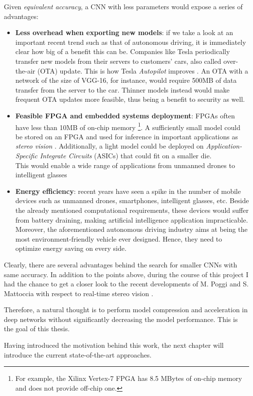 Given \emph{equivalent accuracy}, a CNN with less parameters would expose a series of advantages: 

\begin{itemize}
    \item \textbf{Less overhead when exporting new models}: if we take a look at an important recent trend such as that of autonomous driving, it is immediately clear how big of a benefit this can be. Companies like Tesla periodically transfer new models from their servers to customers' cars, also called over-the-air (OTA) update. This is how Tesla \emph{Autopilot} improves \parencite{tesla}. An OTA with a network of the size of VGG-16, for instance, would require 500MB of data transfer from the server to the car. Thinner models instead would make frequent OTA updates more feasible, thus being a benefit to security as well. 
    
    \item \textbf{Feasible FPGA and embedded systems deployment}: FPGAs often have less than 10MB of on-chip memory \footnote{For example, the Xilinx Vertex-7 FPGA has 8.5 MBytes of on-chip memory and does not provide off-chip one.}. A sufficiently small model could be stored on an FPGA and used for inference in important applications as \emph{stereo vision} \parencite{mattoccia}. Additionally, a light model could be deployed on \emph{Application-Specific Integrate Circuits} (ASICs) that could fit on a smaller die.  \\
    This would enable a wide range of applications from unmanned drones to intelligent glasses
    
    \item \textbf{Energy efficiency}: recent years have seen a spike in the number of mobile devices such as unmanned drones, smartphones, intelligent glasses, etc. Beside the already mentioned computational requirements, these devices would suffer from battery draining, making artificial intelligence application impracticable. \\
    Moreover, the aforementioned autonomous driving industry aims at being the most environment-friendly vehicle ever designed. Hence, they need to optimize energy saving on every side. 
    
\end{itemize}

Clearly, there are several advantages behind the search for smaller CNNs with same accuracy. In addition to the points above, during the course of this project I had the chance to get a closer look to the recent developments of M. Poggi and S. Mattoccia with respect to real-time stereo vision \parencite{poggi-wear} \parencite{poggi-crosswalk}.

Therefore, a natural thought is to perform model compression and acceleration in deep networks without significantly decreasing the model performance. This is the goal of this thesis.
\newline 

Having introduced the motivation behind this work, the next chapter will introduce the current state-of-the-art approaches. 

